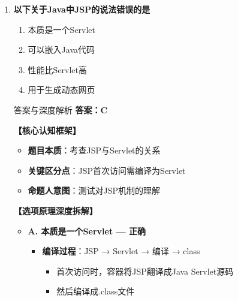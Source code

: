 \documentclass[12pt, a4paper]{ctexart}
\begin{document}
\begin{enumerate}[label=\textbf{\arabic*.}]
\begin{bluebox}{答案与深度解析}
\begin{enumerate}[leftmargin=*, nosep]
			      \item \textbf{调用次数}：
			            \begin{itemize}[label={}, nosep]
				            \item init()：一次
				            \item service()：每次请求
				            \item destroy()：一次
			            \end{itemize}
		      \end{enumerate}

		      \textbf{【命题趋势与实战策略】}

		      \textbf{考场秒杀技巧}：Servlet生命周期 = init + service + destroy
	      \end{bluebox}

	\item \textbf{以下关于Java中JSP的说法错误的是}
	      \begin{enumerate}[label=\Alph*.]
		      \item 本质是一个Servlet
		      \item 可以嵌入Java代码
		      \item 性能比Servlet高
		      \item 用于生成动态网页
	      \end{enumerate}

	      \begin{bluebox}{答案与深度解析}
		      \textbf{答案：C}

		      \textbf{【核心认知框架】}
		      \begin{itemize}[label={}, leftmargin=*, nosep]
			      \item \textbf{题目本质}：考查JSP与Servlet的关系
			      \item \textbf{关键区分点}：JSP首次访问需编译为Servlet
			      \item \textbf{命题人意图}：测试对JSP机制的理解
		      \end{itemize}

		      \textbf{【选项原理深度拆解】}
					  \begin{itemize}[label={}, leftmargin=*, nosep]

		      \item \textbf{A. 本质是一个Servlet — 正确}
		      \begin{itemize}[label={}, leftmargin=*, nosep]
			      \item \textbf{编译过程}：JSP → Servlet → 编译 → class
			            \begin{itemize}[label={}, nosep]
				            \item 首次访问时，容器将JSP翻译成Java Servlet源码
				            \item 然后编译成.class文件
			            \end{itemize}
		      \end{itemize}


\end{itemize}
\end{bluebox}
\end{enumerate}
\end{document}
